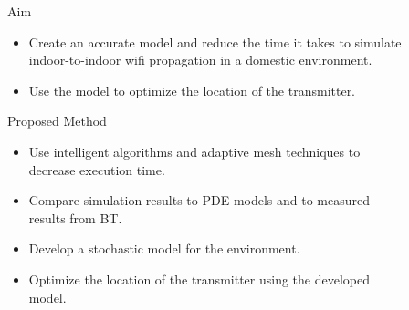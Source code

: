 \documentclass[final]{beamer}
\theoremstyle{plain}
\theoremstyle{definition}
\theoremstyle{remark}
\newlength{\sepwid}
\newlength{\twocolwid}
\newlength{\threecolwid}
\begin{document}
\begin{frame}[t]
\begin{columns}[t]
\begin{column}{\twocolwid}
\end{column} %

\begin{column}{\sepwid}\end{column} %
\begin{column}{\sepwid}\end{column} %
\begin{column}{\threecolwid} %
\begin{mdframed}[backgroundcolor=white, userdefinedwidth=0.999999\linewidth]
    \centering
    \center
  
    \end{mdframed}
    \vspace{1.5cm}

\begin{alertblock}{Aim}

\begin{itemize}
\item Create an accurate model and reduce the time it takes to simulate indoor-to-indoor wifi propagation in a domestic environment.
\item Use the model to optimize the location of the transmitter.
\end{itemize}
\end{alertblock}



\begin{block}{Proposed Method}
\vspace{-2cm}
\begin{itemize}
\item Use intelligent algorithms and adaptive mesh techniques to decrease execution time.
\item Compare simulation results to PDE models and to measured results from BT.
\item Develop a stochastic model for the environment.
\item Optimize the location of the transmitter using the developed model.
\end{itemize}
\end{block}


\end{column}
\end{columns}
\end{frame}
\end{document}
